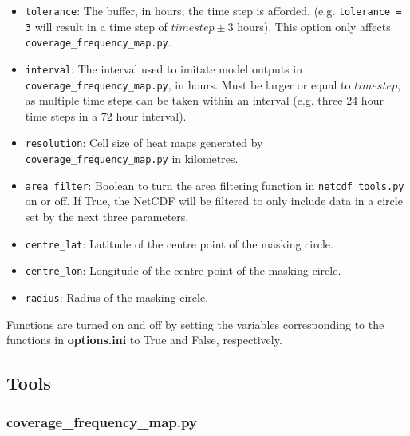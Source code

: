 \documentclass{article}
\begin{document}
\begin{itemize}
\begin{itemize}
                    \item \verb?tolerance?: The buffer, in hours, the time step is afforded. (e.g. \verb?tolerance = 3? will result in a time step of $timestep \pm 3$ hours). This option only affects \verb?coverage_frequency_map.py?.
                    \item \verb?interval?: The interval used to imitate model outputs in \verb?coverage_frequency_map.py?, in hours. Must be larger or equal to $timestep$, as multiple time steps can be taken within an interval (e.g. three 24 hour time steps in a 72 hour interval).
                    \item \verb?resolution?: Cell size of heat maps generated by \verb?coverage_frequency_map.py? in kilometres.
                    \item \verb?area_filter?: Boolean to turn the area filtering function in \verb?netcdf_tools.py? on or off. If True, the NetCDF will be filtered to only include data in a circle set by the next three parameters.
                    \item \verb?centre_lat?: Latitude of the centre point of the masking circle.
                    \item \verb?centre_lon?: Longitude of the centre point of the masking circle.
                    \item \verb?radius?: Radius of the masking circle.
                \end{itemize}
            \end{itemize}

        Functions are turned on and off by setting the variables corresponding to the functions in \textbf{options.ini} to True and False, respectively.

    \subsection{Tools}

        \subsubsection{\textbf{coverage\_frequency\_map.py}}
\end{document}

